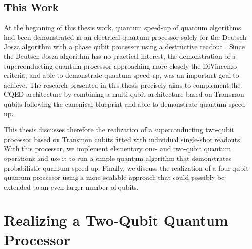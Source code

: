 \subsection{This Work}

At the beginning of this thesis work, quantum speed-up of quantum algorithms had been   demonstrated in an electrical quantum processor solely for the Deutsch-Josza algorithm with   a phase qubit processor  using a destructive readout \citep{yamamoto_quantum_2010}. Since the Deutsch-Josza algorithm has no practical interest, the demonstration of a  superconducting  quantum processor   approaching more closely  the DiVincenzo criteria, and able to demonstrate quantum speed-up, was an important goal to achieve. The research presented in this thesis  precisely  aims  to complement the CQED architecture by combining a multi-qubit architecture based on Transmon qubits  following the canonical blueprint and able to demonstrate quantum speed-up. 


\smallskip

This thesis discusses therefore the realization of a superconducting two-qubit processor based on Transmon qubits fitted with individual single-shot readouts. With this processor, we implement elementary one- and two-qubit quantum operations and use it to run a simple quantum algorithm that demonstrates probabilistic quantum speed-up. Finally, we discuss the realization of a four-qubit quantum processor using a more scalable approach that could possibly be extended to an even larger number of qubits.

\section{Realizing a Two-Qubit Quantum Processor}

